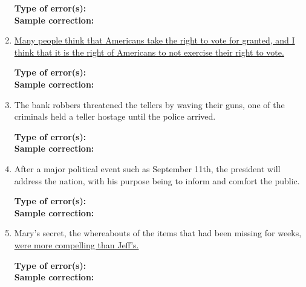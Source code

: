 \begin{enumerate}
\bigskip
\textbf{Type of error(s):} \hrulefill  \\
\textbf{Sample correction:} \hrulefill

\item \ul{Many people think that Americans take the right to vote for granted, and I think that it is the right of Americans to not exercise their right to vote.}

\bigskip
\textbf{Type of error(s):} \hrulefill  \\
\textbf{Sample correction:} \hrulefill

\item The bank robbers threatened the tellers by waving their guns, one of the criminals held a teller hostage until the police arrived. 

\bigskip
\textbf{Type of error(s):} \hrulefill  \\
\textbf{Sample correction:} \hrulefill

\item After a major political event such as September 11th, the president will address the nation, with his purpose being to inform and comfort the public.

\bigskip
\textbf{Type of error(s):} \hrulefill  \\
\textbf{Sample correction:} \hrulefill

\item Mary's secret, the whereabouts of the items that had been missing for weeks, \ul{were more compelling than Jeff's.}

\bigskip
\textbf{Type of error(s):} \hrulefill  \\
\textbf{Sample correction:} \hrulefill

\end{enumerate}